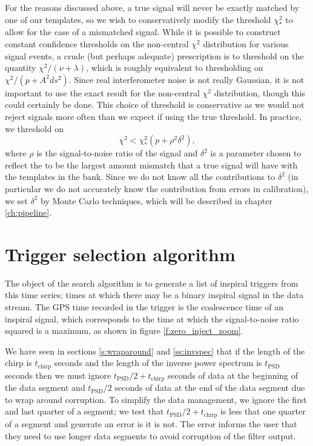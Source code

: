 For the reasons discussed above, a true signal will never be exactly matched
by one of our templates, so we wish to conservatively modify the threshold
$\chi^2_\ast$ to allow for the case of a mismatched signal. While it is
possible to construct constant confidence thresholds on the non-central
$\chi^2$ distribution for various signal events, a crude (but perhaps
adequate) prescription is to threshold on the quantity
$\chi^2/(\nu+\lambda)$, which is roughly equivalent to thresholding on
$\chi^2/(p+A^2 ds^2)$.  Since real interferometer noise is not really
Gaussian, it is not important to use the exact result for the non-central
$\chi^2$ distribution, though this could certainly be done. This choice of
threshold is conservative as we would not reject signals more often than we
expect if using the true threshold.  In practice, we threshold on 
\begin{equation}
\chi^2 < \chi^2_\ast (p+\rho^2 \delta^2),
\label{eq:chisqthresholdtest}
\end{equation}
where $\rho$ is the signal-to-noise ratio of the signal and $\delta^2$ is a
parameter chosen to reflect the to be the largest amount mismatch that a true
signal will have with the templates in the bank. Since we do not know all the
contributions to $\delta^2$ (in particular we do not accurately know the
contribution from errors in calibration), we set $\delta^2$ by Monte Carlo
techniques, which will be described in chapter \ref{ch:pipeline}.

\section{Trigger selection algorithm}
\label{s:maxoverchirp}

The object of the search algorithm is to generate a list of inspiral triggers
from this time series; times at which there may be a binary inspiral signal in
the data stream. The GPS time recorded in the trigger is the coalescence time of
an inspiral signal, which corresponds to the time at which the signal-to-noise
ratio squared is a maximum, as shown in figure \ref{f:zero_inject_zoom}.

We have seen in sections \ref{s:wraparound} and \ref{ss:invspec} that if the
length of the chirp is $t_\mathrm{chirp}$ seconds and the length of the
inverse power spectrum is $t_\mathrm{PSD}$ seconds then we must ignore
$t_\mathrm{PSD}/2 + t_\mathrm{chirp}$ seconds of data at the beginning of the
data segment and $t_\mathrm{PSD}/2$ seconds of data at the end of the data
segment due to wrap around corruption. To simplify the data management, we
ignore the first and last quarter of a segment; we test that $t_\mathrm{PSD}/2
+ t_\mathrm{chirp}$ is less that one quarter of a segment and generate an
error is it is not. The error informs the user that they need to use longer
data segments to avoid corruption of the filter output.

